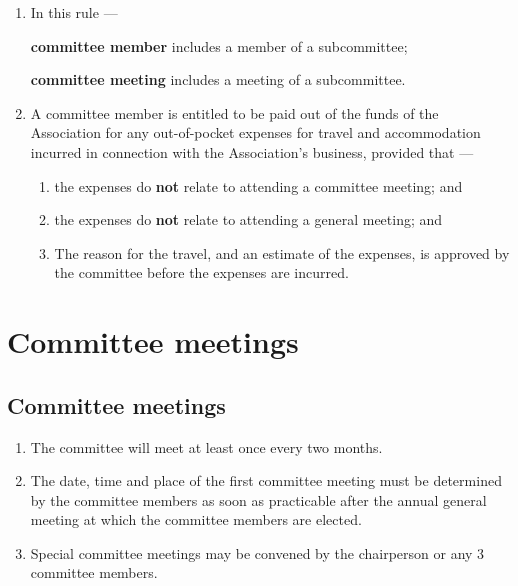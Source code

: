 \documentclass[../constitution.tex]{subfiles}
\begin{document}
\begin{enumerate}

  \item In this rule ---

        \textbf{committee member} includes a member of a subcommittee;

        \textbf{committee meeting} includes a meeting of a subcommittee.

  \item A committee member is entitled to be paid out of the funds of the Association for any out-of-pocket expenses for travel and accommodation incurred in connection with the Association's business, provided that ---

        \begin{enumerate}

          \item the expenses do \textbf{not} relate to attending a committee meeting; and
          \item the expenses do \textbf{not} relate to attending a general meeting; and
          \item The reason for the travel, and an estimate of the expenses, is approved by the committee before the expenses are incurred.
        \end{enumerate}
\end{enumerate}




\hypertarget{division-4-committee-meetings}{%
  \section{Committee meetings}\label{division-4-committee-meetings}}

\hypertarget{committee-meetings}{%
  \subsection{Committee meetings}\label{committee-meetings}}

\begin{enumerate}

  \item The committee will meet at least once every two months.
  \item \label{first-committee-meeting} The date, time and place of the first committee meeting must be determined by the committee members as soon as practicable after the annual general meeting at which the committee members are elected.


  \item Special committee meetings may be convened by the chairperson or any 3 committee members.
\end{enumerate}
\end{document}
